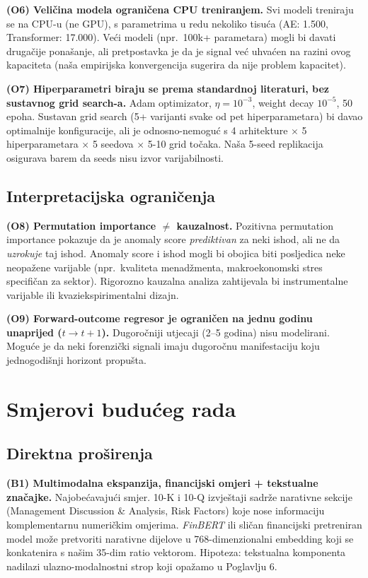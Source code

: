 \documentclass[diplomskirad,authoryear]{fer}
\begin{document}
\textbf{(O6) Veličina modela ograničena CPU treniranjem.} Svi modeli treniraju se na CPU-u (ne GPU), s parametrima u redu nekoliko tisuća (AE: 1.500, Transformer: 17.000). Veći modeli (npr.\ 100k+ parametara) mogli bi davati drugačije ponašanje, ali pretpostavka je da je signal već uhvaćen na razini ovog kapaciteta (naša empirijska konvergencija sugerira da nije problem kapacitet).

\textbf{(O7) Hiperparametri biraju se prema standardnoj literaturi, bez sustavnog grid search-a.} Adam optimizator, $\eta=10^{-3}$, weight decay $10^{-5}$, 50 epoha. Sustavan grid search (5+ varijanti svake od pet hiperparametara) bi davao optimalnije konfiguracije, ali je odnosno-nemoguć s 4 arhitekture $\times$ 5 hiperparametara $\times$ 5 seedova $\times$ 5-10 grid točaka. Naša 5-seed replikacija osigurava barem da seeds nisu izvor varijabilnosti.

\subsection{Interpretacijska ograničenja}

\textbf{(O8) Permutation importance $\neq$ kauzalnost.} Pozitivna permutation importance pokazuje da je anomaly score \emph{prediktivan} za neki ishod, ali ne da \emph{uzrokuje} taj ishod. Anomaly score i ishod mogli bi obojica biti posljedica neke neopažene varijable (npr.\ kvaliteta menadžmenta, makroekonomski stres specifičan za sektor). Rigorozno kauzalna analiza zahtijevala bi instrumentalne varijable ili kvaziekspirimentalni dizajn.

\textbf{(O9) Forward-outcome regresor je ograničen na jednu godinu unaprijed ($t \to t+1$).} Dugoročniji utjecaji (2--5 godina) nisu modelirani. Moguće je da neki forenzički signali imaju dugoročnu manifestaciju koju jednogodišnji horizont propušta.

\section{Smjerovi budućeg rada}

\subsection{Direktna proširenja}

\textbf{(B1) Multimodalna ekspanzija, financijski omjeri + tekstualne značajke.} Najobećavajući smjer. 10-K i 10-Q izvještaji sadrže narativne sekcije (Management Discussion \& Analysis, Risk Factors) koje nose informaciju komplementarnu numeričkim omjerima. \emph{FinBERT} \citep{huang2023finbert} ili sličan financijski pretreniran model može pretvoriti narativne dijelove u 768-dimenzionalni embedding koji se konkatenira s našim 35-dim ratio vektorom. Hipoteza: tekstualna komponenta nadilazi ulazno-modalnostni strop koji opažamo u Poglavlju 6.
\end{document}

